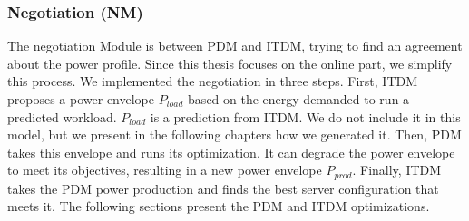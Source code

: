 \subsubsection{Negotiation (NM)}

The negotiation Module is between PDM and ITDM, trying to find an agreement about the power profile. Since this thesis focuses on the online part, we simplify this process. We implemented the negotiation in three steps. First, ITDM proposes a power envelope $P_{load}$ based on the energy demanded to run a predicted workload. $P_{load}$ is a prediction from ITDM. We do not include it in this model, but we present in the following chapters how we generated it. Then, PDM takes this envelope and runs its optimization. It can degrade the power envelope to meet its objectives, resulting in a new power envelope $P_{prod}$. Finally, ITDM takes the PDM power production and finds the best server configuration that meets it. The following sections present the PDM and ITDM optimizations.

